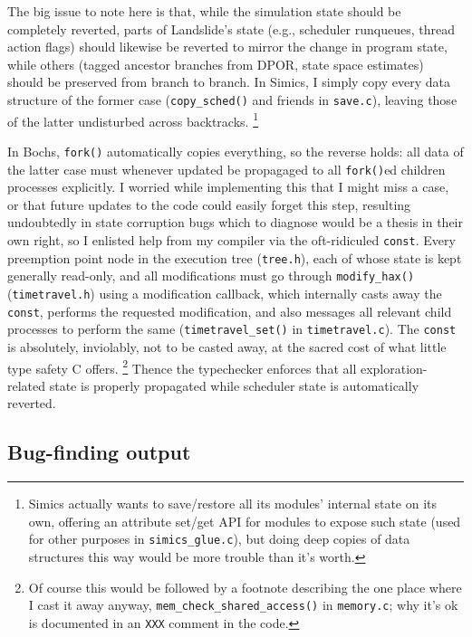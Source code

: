 The big issue to note here is that, while the simulation state should be completely reverted,
parts of Landslide's state (e.g., scheduler runqueues, thread action flags)
should likewise be reverted to mirror the change in program state,
while others (tagged ancestor branches from DPOR, state space estimates) should be preserved from branch to branch.
In Simics, I simply copy every data structure of the former case ({\tt copy\_sched()} and friends in {\tt save.c}),
leaving those of the latter undisturbed across backtracks.%
\footnote{Simics actually wants to save/restore all its modules' internal state on its own,
offering an attribute set/get API for modules to expose such state (used for other purposes in {\tt simics\_glue.c}),
but doing deep copies of data structures this way would be more trouble than it's worth.}

In Bochs, {\tt fork()} automatically copies everything, so the reverse holds:
all data of the latter case must whenever updated be propagaged to all {\tt fork()}ed children processes explicitly.
I worried while implementing this that I might miss a case, or that future updates to the code could easily forget this step,
resulting undoubtedly in state corruption bugs which to diagnose would be a thesis in their own right,
so I enlisted help from my compiler via the oft-ridiculed {\tt const}.
Every preemption point node in the execution tree ({\tt tree.h}),
each of whose state is kept generally read-only,
and all modifications must go through {\tt modify\_hax()} ({\tt timetravel.h}) using a modification callback,
which internally casts away the {\tt const}, performs the requested modification,
and also messages all relevant child processes to perform the same ({\tt timetravel\_set()} in {\tt timetravel.c}).
The {\tt const} is absolutely, inviolably, not to be casted away, at the sacred cost of what little type safety C offers.%
\footnote{Of course this would be followed by a footnote describing the one place where I cast it away anyway,
{\tt mem\_check\_shared\_access()} in {\tt memory.c};
why it's ok is documented in an {\tt XXX} comment in the code.}
Thence the typechecker enforces that all exploration-related state is properly propagated while scheduler state is automatically reverted.


\subsection{Bug-finding output}

